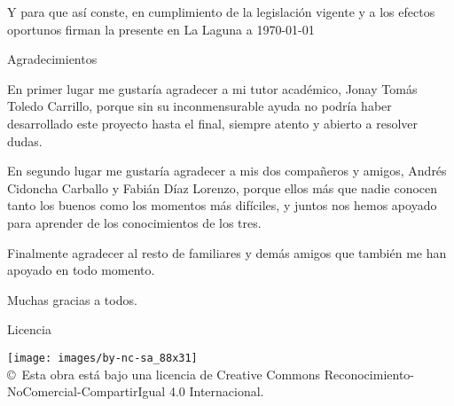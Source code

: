 \documentclass[spanish,a4paper,14pt,oneside]{extreport}
\begin{document}
\bigskip
\bigskip

Y para que así conste, en cumplimiento de la legislación vigente y a los efectos
oportunos firman la presente en La Laguna a \today

\newpage
\thispagestyle{empty}

{ \flushright

\begin{LARGE}
Agradecimientos
\end{LARGE}

\hspace{3mm}

\begin{large}


\hspace{3mm}
En primer lugar me gustaría agradecer a mi tutor académico, Jonay Tomás Toledo
Carrillo, porque sin su inconmensurable ayuda no podría haber desarrollado este
proyecto hasta el final, siempre atento y abierto a resolver dudas.

\hspace{3mm}
En segundo lugar me gustaría agradecer a mis dos compañeros y amigos, Andrés
Cidoncha Carballo y Fabián Díaz Lorenzo, porque ellos más que nadie conocen
tanto los buenos como los momentos más difíciles, y juntos nos hemos apoyado
para aprender de los conocimientos de los tres.

\hspace{3mm}
Finalmente agradecer al resto de familiares y demás amigos que también me han
apoyado en todo momento. 

\hspace{3mm}
Muchas gracias a todos.


\end{large}

}

\newpage

\begin{huge}
Licencia
\end{huge}

\begin{center}
\texttt{[image: images/by-nc-sa\_88x31]}\\[10mm]
{\Large \copyright~Esta obra está bajo una licencia de Creative Commons Reconocimiento-NoComercial-CompartirIgual 4.0 Internacional.
}
\end{center}
\end{document}
